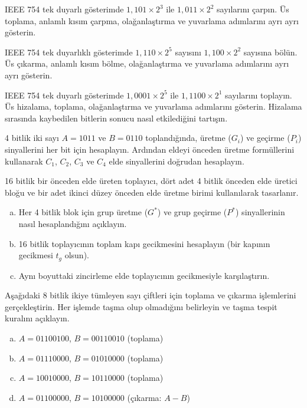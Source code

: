 \begin{alistirma}[\orta]
IEEE 754 tek duyarlı gösterimde $1{,}101 \times 2^3$ ile $1{,}011 \times 2^2$ sayılarını çarpın. Üs toplama, anlamlı kısım çarpma, olağanlaştırma ve yuvarlama adımlarını ayrı ayrı gösterin.
\end{alistirma}

\begin{alistirma}[\orta]
IEEE 754 tek duyarlıklı gösterimde $1{,}110 \times 2^{5}$ sayısını $1{,}100 \times 2^{2}$ sayısına bölün. Üs çıkarma, anlamlı kısım bölme, olağanlaştırma ve yuvarlama adımlarını ayrı ayrı gösterin.
\end{alistirma}

\begin{alistirma}[\orta]
IEEE 754 tek duyarlı gösterimde $1{,}0001 \times 2^5$ ile $1{,}1100 \times 2^1$ sayılarını toplayın. Üs hizalama, toplama, olağanlaştırma ve yuvarlama adımlarını gösterin. Hizalama sırasında kaybedilen bitlerin sonucu nasıl etkilediğini tartışın.
\end{alistirma}

\begin{alistirma}[\orta]
4 bitlik iki sayı $A = 1011$ ve $B = 0110$ toplandığında, üretme ($G_i$) ve geçirme ($P_i$) sinyallerini her bit için hesaplayın. Ardından eldeyi önceden üretme formüllerini kullanarak $C_1$, $C_2$, $C_3$ ve $C_4$ elde sinyallerini doğrudan hesaplayın.
\end{alistirma}

\begin{alistirma}[\zor]
16 bitlik bir önceden elde üreten toplayıcı, dört adet 4 bitlik önceden elde üretici bloğu ve bir adet ikinci düzey önceden elde üretme birimi kullanılarak tasarlanır.
\begin{enumerate}[(a)]
\item Her 4 bitlik blok için grup üretme ($G^*$) ve grup geçirme ($P^*$) sinyallerinin nasıl hesaplandığını açıklayın.
\item 16 bitlik toplayıcının toplam kapı gecikmesini hesaplayın (bir kapının gecikmesi $t_g$ olsun).
\item Aynı boyuttaki zincirleme elde toplayıcının gecikmesiyle karşılaştırın.
\end{enumerate}
\end{alistirma}

\begin{alistirma}[\orta]
Aşağıdaki 8 bitlik ikiye tümleyen sayı çiftleri için toplama ve çıkarma işlemlerini gerçekleştirin. Her işlemde taşma olup olmadığını belirleyin ve taşma tespit kuralını açıklayın.
\begin{enumerate}[(a)]
\item $A = 01100100$, $B = 00110010$ (toplama)
\item $A = 01110000$, $B = 01010000$ (toplama)
\item $A = 10010000$, $B = 10110000$ (toplama)
\item $A = 01100000$, $B = 10100000$ (çıkarma: $A - B$)
\end{enumerate}
\end{alistirma}

